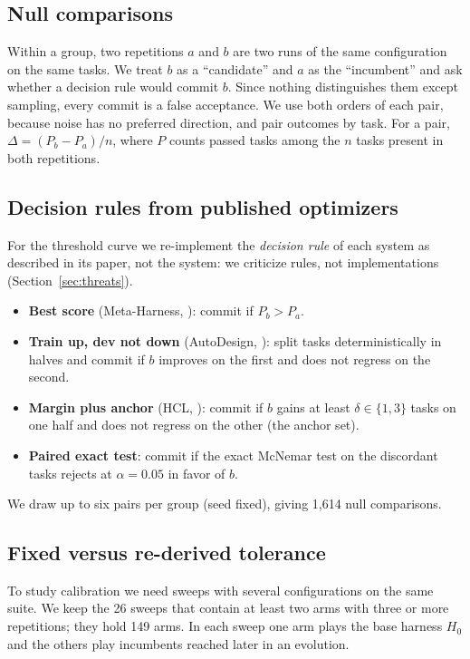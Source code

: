 \subsection{Null comparisons}\label{sec:null}
Within a group, two repetitions $a$ and $b$ are two runs of the same
configuration on the same tasks. We treat $b$ as a ``candidate'' and $a$ as the
``incumbent'' and ask whether a decision rule would commit $b$. Since nothing
distinguishes them except sampling, every commit is a false acceptance. We use
both orders of each pair, because noise has no preferred direction, and pair
outcomes by task. For a pair, $\Delta = (P_b - P_a)/n$, where $P$ counts passed
tasks among the $n$ tasks present in both repetitions.

\subsection{Decision rules from published optimizers}\label{sec:rules}
For the threshold curve we re-implement the \emph{decision rule} of each system
as described in its paper, not the system: we criticize rules, not
implementations (Section~\ref{sec:threats}).
\begin{itemize}
  \item \textbf{Best score} (Meta-Harness, \citealp{lee2026metaharness}):
  commit if $P_b > P_a$.
  \item \textbf{Train up, dev not down} (AutoDesign,
  \citealp{luo2026autodesign}): split tasks deterministically in halves and
  commit if $b$ improves on the first and does not regress on the second.
  \item \textbf{Margin plus anchor} (HCL, \citealp{kang2026hcl}): commit if $b$
  gains at least $\delta \in \{1, 3\}$ tasks on one half and does not regress on
  the other (the anchor set).
  \item \textbf{Paired exact test}: commit if the exact McNemar test on the
  discordant tasks rejects at $\alpha = 0.05$ in favor of $b$.
\end{itemize}
We draw up to six pairs per group (seed fixed), giving 1{,}614 null comparisons.

\subsection{Fixed versus re-derived tolerance}\label{sec:fixed}
To study calibration we need sweeps with several configurations on the same
suite. We keep the 26 sweeps that contain at least two arms with three or more
repetitions; they hold 149 arms. In each sweep one arm plays the base harness
$H_0$ and the others play incumbents reached later in an evolution.

